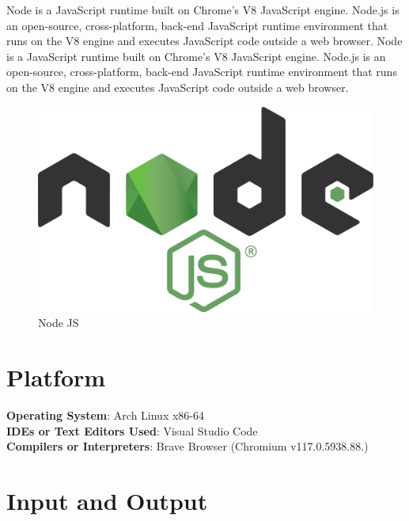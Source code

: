 \documentclass[11pt]{article}
\begin{document}
Node is a JavaScript runtime built on Chrome's V8 JavaScript engine. Node.js is an open-source, cross-platform, back-end JavaScript runtime environment that runs on the V8 engine and executes JavaScript code outside a web browser. Node is a JavaScript runtime built on Chrome's V8 JavaScript engine. Node.js is an open-source, cross-platform, back-end JavaScript runtime environment that runs on the V8 engine and executes JavaScript code outside a web browser.

\begin{figure}[H]
    \centering
    \includegraphics[width=.45\textwidth]{NodeJS/NodeJS_0.jpg}
    \caption{Node JS}
\end{figure}

\section{Platform}
\textbf{Operating System}: Arch Linux x86-64 \\
\textbf{IDEs or Text Editors Used}: Visual Studio Code\\
\textbf{Compilers or Interpreters}: Brave Browser (Chromium v117.0.5938.88.) \\

\section{Input and Output}
\end{document}
